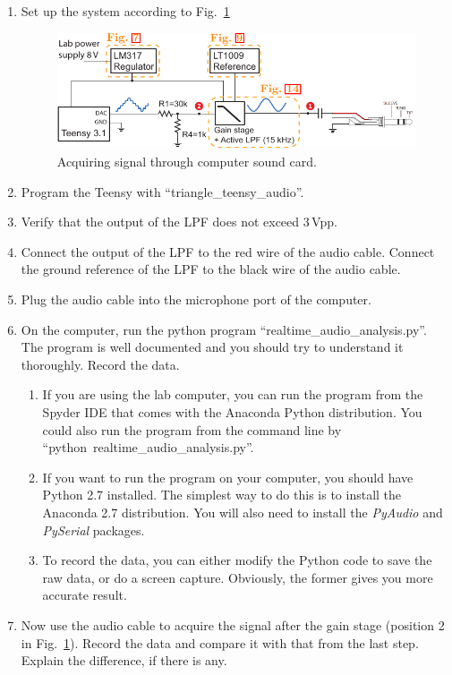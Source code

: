 \documentclass[letterpaper, 11pt]{article}
\begin{document}
\begin{enumerate}
	\item Set up the system according to Fig.~\ref{fig:audio-1}
		\begin{figure}[h]
			\includegraphics[width=5in]{audio-1}
			\caption{Acquiring signal through computer sound card.}
			\label{fig:audio-1}
		\end{figure}

	\item Program the Teensy with ``triangle\_teensy\_audio''. 
	
	\item Verify that the output of the LPF does not exceed 3\,Vpp. 	

	\item Connect the output of the LPF to the red wire of the audio cable. Connect the ground reference of the LPF to the black wire of the audio cable. 
	
	\item Plug the audio cable into the microphone port of the computer.
	
	\item On the computer, run the python program ``realtime\_audio\_analysis.py''. The program is well documented and you should try to understand it thoroughly. Record the data. 
		\begin{enumerate}
			\item If you are using the lab computer, you can run the program from the Spyder IDE that comes with the Anaconda Python distribution. You could also run the program from the command line by ``python~realtime\_audio\_analysis.py''. 
			
			\item If you want to run the program on your computer, you should have Python 2.7 installed. The simplest way to do this is to install the Anaconda 2.7 distribution. You will also need to install the \textit{PyAudio} and \textit{PySerial} packages. 
			
			\item To record the data, you can either modify the Python code to save the raw data, or do a screen capture. Obviously, the former gives you more accurate result. 
		\end{enumerate}
	
	\item Now use the audio cable to acquire the signal after the gain stage (position 2 in Fig.~\ref{fig:audio-1}). Record the data and compare it with that from the last step. Explain the difference, if there is any. 
\end{enumerate}
\end{document}
